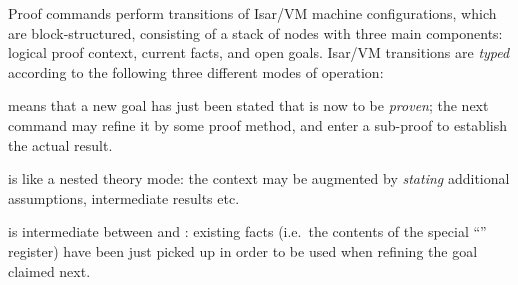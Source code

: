 \begin{isabellebody}
\begin{isamarkuptext}
\begin{descr}
  \end{descr}%
\end{isamarkuptext}%
\isamarkuptrue%
%
\isamarkuptrue%
%
\begin{isamarkuptext}%
Proof commands perform transitions of Isar/VM machine
  configurations, which are block-structured, consisting of a stack of
  nodes with three main components: logical proof context, current
  facts, and open goals.  Isar/VM transitions are \emph{typed}
  according to the following three different modes of operation:

  \begin{descr}

  \item [\isa{proof{\isacharparenleft}prove{\isacharparenright}}] means that a new goal has just been
  stated that is now to be \emph{proven}; the next command may refine
  it by some proof method, and enter a sub-proof to establish the
  actual result.

  \item [\isa{proof{\isacharparenleft}state{\isacharparenright}}] is like a nested theory mode: the
  context may be augmented by \emph{stating} additional assumptions,
  intermediate results etc.

  \item [\isa{proof{\isacharparenleft}chain{\isacharparenright}}] is intermediate between  and : existing facts (i.e.\
  the contents of the special ``'' register) have been
  just picked up in order to be used when refining the goal claimed
  next.

  \end{descr}


\end{isamarkuptext}
\end{isabellebody}
